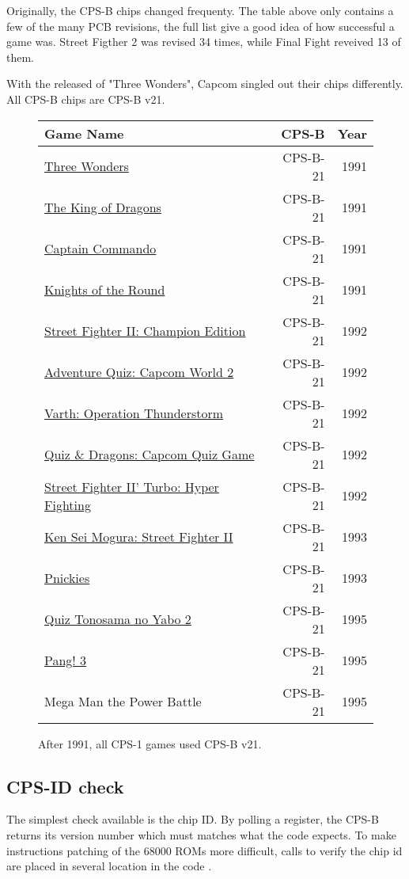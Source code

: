 Originally, the CPS-B chips changed frequenty. The table above only contains a few of the many PCB revisions, the full list give a good idea of how successful a game was. Street Figther 2 was revised 34 times, while Final Fight reveived 13 of them.

With the released of "Three Wonders", Capcom singled out their chips differently. All CPS-B chips are CPS-B v21.

\begin{figure}[H]
{ \setlength{\tabcolsep}{3.0pt}
\begin{tabularx}{\textwidth}{Xrr} 
  \textbf{Game Name} & \textbf{ CPS-B }  & \textbf{ Year } \\               
  \toprule    
\href{}{Three Wonders} &  CPS-B-21 & 1991 \\ 
\href{}{The King of Dragons} & CPS-B-21 & 1991 \\ 
\href{}{Captain Commando} &  CPS-B-21 & 1991 \\ 
\href{}{Knights of the Round} & CPS-B-21 & 1991 \\ 
  \toprule    
\href{}{Street Fighter II: Champion Edition} & CPS-B-21 & 1992 \\ 
\href{}{Adventure Quiz: Capcom World 2} & CPS-B-21 & 1992 \\ 
\href{}{Varth: Operation Thunderstorm} & CPS-B-21 & 1992 \\ 
\href{}{Quiz \& Dragons: Capcom Quiz Game} & CPS-B-21 & 1992 \\ 
\href{}{Street Fighter II' Turbo: Hyper Fighting} &  CPS-B-21 & 1992 \\ 
  \toprule    
\href{}{Ken Sei Mogura: Street Fighter II} & CPS-B-21 & 1993 \\ 
\href{}{Pnickies} & CPS-B-21 & 1993 \\ 
  \toprule    
\href{}{Quiz Tonosama no Yabo 2} &  CPS-B-21 & 1995 \\ 
\href{}{Pang! 3} & CPS-B-21  & 1995 \\ 
Mega Man the Power Battle & CPS-B-21  & 1995 \\

\toprule    
\end{tabularx}%
}\caption*{After 1991, all CPS-1 games used CPS-B v21.}
\end{figure}


\subsection{CPS-ID check}
The simplest check available is the chip ID. By polling a register, the CPS-B returns its version number which must matches what the code expects. To make instructions patching of the 68000 ROMs more difficult, calls to verify the chip id are placed in several location in the code .

